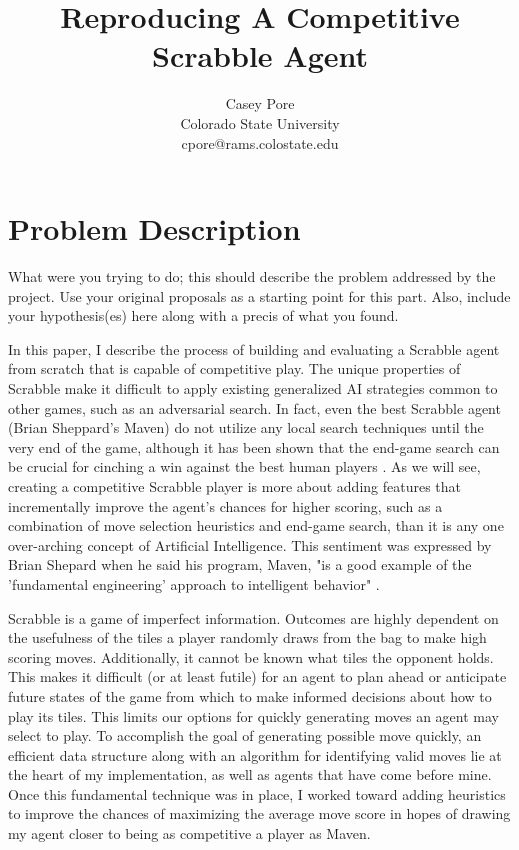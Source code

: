 \documentclass[letterpaper]{article}
\title{Reproducing A Competitive Scrabble Agent}
\author{Casey Pore \\
Colorado State University\\
cpore@rams.colostate.edu\\
}
\begin{document}
\maketitle


\section{Problem Description}
What were you trying to do; this should describe the problem addressed by the project. Use your original proposals as a starting point for this part. Also, include your hypothesis(es) here along with a precis of what you found.


In this paper, I describe the process of building and evaluating a Scrabble agent from scratch that is capable of competitive play. The unique properties of Scrabble make it difficult to apply existing generalized AI strategies common to other games, such as an adversarial search. In fact, even the best Scrabble agent (Brian Sheppard's Maven) do not utilize any local search techniques until the very end of the game, although it has been shown that the end-game search can be crucial for cinching a win against the best human players \cite{1sheppard2002}. As we will see, creating a competitive Scrabble player is more about adding features that incrementally improve the agent's chances for higher scoring, such as a combination of move selection heuristics and end-game search, than it is any one over-arching concept of Artificial Intelligence. This sentiment was expressed by Brian Shepard when he said his program, Maven, "is a good example of the 'fundamental engineering' approach to intelligent behavior" \cite{1sheppard2002}.

Scrabble is a game of imperfect information. Outcomes are highly dependent on the usefulness of the tiles a player randomly draws from the bag to make high scoring moves. Additionally, it cannot be known what tiles the opponent holds. This makes it difficult (or at least futile) for an agent to plan ahead or anticipate future states of the game from which to make informed decisions about how to play its tiles. This limits our options for quickly generating moves an agent may select to play. To accomplish the goal of generating possible move quickly, an efficient data structure along with an algorithm for identifying valid moves lie at the heart of my implementation, as well as agents that have come before mine. Once this fundamental technique was in place, I worked toward adding heuristics to improve the chances of maximizing the average move score in hopes of drawing my agent closer to being as competitive a player as Maven.
\end{document}
